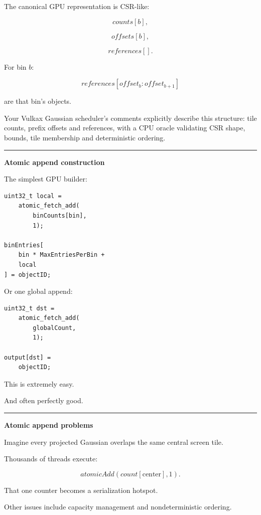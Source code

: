 The canonical GPU representation is CSR-like:

\[
counts[b],
\]

\[
offsets[b],
\]

\[
references[].
\]

For bin \(b\):

\[
references[
offset_b
:
offset_{b+1}
]
\]

are that bin's objects.

Your Vulkax Gaussian scheduler's comments explicitly describe this structure: tile counts, prefix offsets and references, with a CPU oracle validating CSR shape, bounds, tile membership and deterministic ordering.

\begin{center}\rule{0.5\linewidth}{0.5pt}\end{center}

\textbf{Atomic append construction}

The simplest GPU builder:

\protect{}\label{p10-atomic-bin}%
\begin{verbatim}
uint32_t local =
    atomic_fetch_add(
        binCounts[bin],
        1);

binEntries[
    bin * MaxEntriesPerBin +
    local
] = objectID;
\end{verbatim}

Or one global append:

\protect{}\label{p10-global-append}%
\begin{verbatim}
uint32_t dst =
    atomic_fetch_add(
        globalCount,
        1);

output[dst] =
    objectID;
\end{verbatim}

This is extremely easy.

And often perfectly good.

\begin{center}\rule{0.5\linewidth}{0.5pt}\end{center}

\textbf{Atomic append problems}

Imagine every projected Gaussian overlaps the same central screen tile.

Thousands of threads execute:

\[
atomicAdd(
count[\text{center}],
1
).
\]

That one counter becomes a serialization hotspot.

Other issues include capacity management and nondeterministic ordering.

